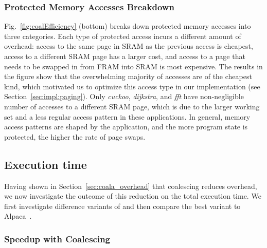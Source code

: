 \subsubsection{Protected Memory Accesses Breakdown}
%
Fig.~\ref{fig:coalEfficiency} (bottom) breaks down protected memory accesses
into three categories.
%
Each type of protected access incurs a different amount of overhead: access to
the same page in SRAM as the previous access is cheapest, access to a different
SRAM page has a larger cost, and access to a page that needs to be swapped in
from FRAM into SRAM is most expensive.
%
The results in the figure show that the overwhelming majority of accesses are
of the cheapest kind, which motivated us to optimize this access type in our
implementation (see Section~\ref{sec:impl:paging}).
%
Only \textit{cuckoo}, \textit{dijkstra}, and \textit{fft} have non-negligible
number of accesses to a different SRAM page, which is due to the larger working
set and a less regular access pattern in these applications.
%
In general, memory access patterns are shaped by the application, and the more
program state is protected, the higher the rate of page swaps.
%
\subsection{Execution time}
\label{sec:result_coalescing}
%
Having shown in Section~\ref{sec:coala_overhead} that coalescing reduces
overhead, we now investigate the outcome of this reduction on the total
execution time. We first investigate difference variants of \sys and
then compare the best variant to Alpaca~\cite{alpaca}.
%
\subsubsection{\sys Speedup with Coalescing}


